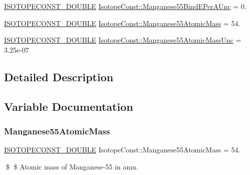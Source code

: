 \begin{DoxyCompactItemize}
\mbox{\hyperlink{group___isotope_const-_macros_ga8f45a7272ce02c0b4c65c44636ed719a}{I\+S\+O\+T\+O\+P\+E\+C\+O\+N\+S\+T\+\_\+\+D\+O\+U\+B\+LE}} \mbox{\hyperlink{group___isotope_const-_manganese-_mn55_ga102b55198cfcedf0b31838ef6c50a8e1}{Isotope\+Const\+::\+Manganese55\+Bind\+E\+Per\+A\+Unc}} = 0.
\item 
\mbox{\hyperlink{group___isotope_const-_macros_ga8f45a7272ce02c0b4c65c44636ed719a}{I\+S\+O\+T\+O\+P\+E\+C\+O\+N\+S\+T\+\_\+\+D\+O\+U\+B\+LE}} \mbox{\hyperlink{group___isotope_const-_manganese-_mn55_ga7de11d51a3f85bf1138d82556ffef7c4}{Isotope\+Const\+::\+Manganese55\+Atomic\+Mass}} = 54.
\item 
\mbox{\hyperlink{group___isotope_const-_macros_ga8f45a7272ce02c0b4c65c44636ed719a}{I\+S\+O\+T\+O\+P\+E\+C\+O\+N\+S\+T\+\_\+\+D\+O\+U\+B\+LE}} \mbox{\hyperlink{group___isotope_const-_manganese-_mn55_gaa7807de4eda1df88020a650de19bcb01}{Isotope\+Const\+::\+Manganese55\+Atomic\+Mass\+Unc}} = 3.\+25e-\/07
\end{DoxyCompactItemize}


\subsection{Detailed Description}


\subsection{Variable Documentation}
\mbox{\label{group___isotope_const-_manganese-_mn55_ga7de11d51a3f85bf1138d82556ffef7c4}} 
\subsubsection{\texorpdfstring{Manganese55\+Atomic\+Mass}{Manganese55AtomicMass}}
{\footnotesize\ttfamily \mbox{\hyperlink{group___isotope_const-_macros_ga8f45a7272ce02c0b4c65c44636ed719a}{I\+S\+O\+T\+O\+P\+E\+C\+O\+N\+S\+T\+\_\+\+D\+O\+U\+B\+LE}} Isotope\+Const\+::\+Manganese55\+Atomic\+Mass = 54.}

\$ \$ Atomic mass of Manganese-\/55 in amu. \mbox{\label{group___isotope_const-_manganese-_mn55_gaa7807de4eda1df88020a650de19bcb01}} 
